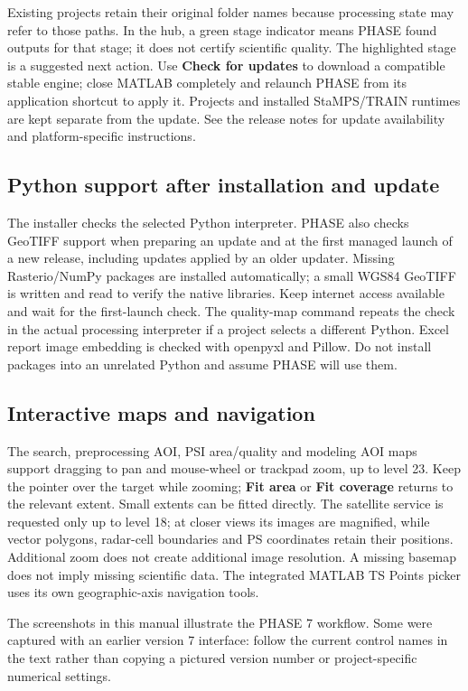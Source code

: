 \documentclass[a4paper,12pt]{report}
\begin{document}
Existing projects retain their original folder names because processing state may refer to those paths. In the hub, a green stage indicator means PHASE found outputs for that stage; it does not certify scientific quality. The highlighted stage is a suggested next action. Use \textbf{Check for updates} to download a compatible stable engine; close MATLAB completely and relaunch PHASE from its application shortcut to apply it. Projects and installed StaMPS/TRAIN runtimes are kept separate from the update. See the release notes for update availability and platform-specific instructions.

\subsection{Python support after installation and update}
The installer checks the selected Python interpreter. PHASE also checks GeoTIFF support when preparing an update and at the first managed launch of a new release, including updates applied by an older updater. Missing Rasterio/NumPy packages are installed automatically; a small WGS84 GeoTIFF is written and read to verify the native libraries. Keep internet access available and wait for the first-launch check. The quality-map command repeats the check in the actual processing interpreter if a project selects a different Python. Excel report image embedding is checked with openpyxl and Pillow. Do not install packages into an unrelated Python and assume PHASE will use them.

\subsection{Interactive maps and navigation}\label{sec:map-navigation}
The search, preprocessing AOI, PSI area/quality and modeling AOI maps support dragging to pan and mouse-wheel or trackpad zoom, up to level 23. Keep the pointer over the target while zooming; \textbf{Fit area} or \textbf{Fit coverage} returns to the relevant extent. Small extents can be fitted directly. The satellite service is requested only up to level 18; at closer views its images are magnified, while vector polygons, radar-cell boundaries and PS coordinates retain their positions. Additional zoom does not create additional image resolution. A missing basemap does not imply missing scientific data. The integrated MATLAB TS Points picker uses its own geographic-axis navigation tools.

The screenshots in this manual illustrate the PHASE 7 workflow. Some were captured with an earlier version 7 interface: follow the current control names in the text rather than copying a pictured version number or project-specific numerical settings.
\end{document}

